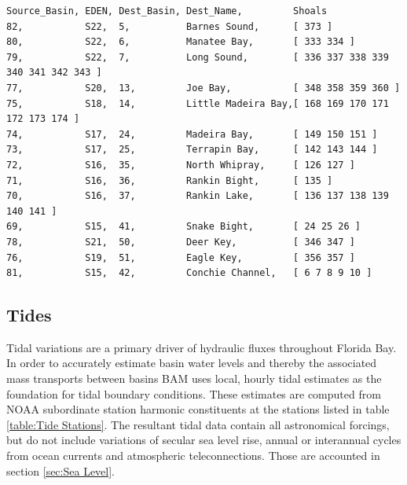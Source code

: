 \small
\begin{verbatim}
Source_Basin, EDEN, Dest_Basin, Dest_Name,         Shoals
82,           S22,  5,          Barnes Sound,      [ 373 ]
80,           S22,  6,          Manatee Bay,       [ 333 334 ]
79,           S22,  7,          Long Sound,        [ 336 337 338 339 340 341 342 343 ]
77,           S20,  13,         Joe Bay,           [ 348 358 359 360 ]
75,           S18,  14,         Little Madeira Bay,[ 168 169 170 171 172 173 174 ]
74,           S17,  24,         Madeira Bay,       [ 149 150 151 ]
73,           S17,  25,         Terrapin Bay,      [ 142 143 144 ]
72,           S16,  35,         North Whipray,     [ 126 127 ]
71,           S16,  36,         Rankin Bight,      [ 135 ]
70,           S16,  37,         Rankin Lake,       [ 136 137 138 139 140 141 ]
69,           S15,  41,         Snake Bight,       [ 24 25 26 ]
78,           S21,  50,         Deer Key,          [ 346 347 ]
76,           S19,  51,         Eagle Key,         [ 356 357 ]
81,           S15,  42,         Conchie Channel,   [ 6 7 8 9 10 ]
\end{verbatim}
\large

\subsection{Tides}
\label{sec:Tides}
Tidal variations are a primary driver of hydraulic fluxes throughout Florida Bay.  In order to accurately estimate basin water levels and thereby the associated mass transports between basins BAM uses local, hourly tidal estimates as the foundation for tidal boundary conditions.  These estimates are computed from NOAA subordinate station harmonic constituents at the stations listed in table \ref{table:Tide Stations}.  The resultant tidal data contain all astronomical forcings, but do not include variations of secular sea level rise, annual or interannual cycles from ocean currents and atmospheric teleconnections.  Those are accounted in section \ref{sec:Sea Level}. 

